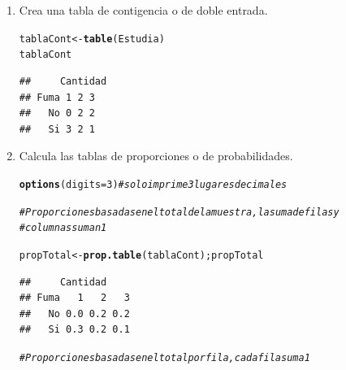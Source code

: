 \documentclass[12pt,letterpaper]{article}\usepackage[]{graphicx}\usepackage[]{color}
\makeatletter
\newcommand{\hlnum}[1]{\textcolor[rgb]{0.686,0.059,0.569}{#1}}%
\newcommand{\hlcom}[1]{\textcolor[rgb]{0.678,0.584,0.686}{\textit{#1}}}%
\newcommand{\hlstd}[1]{\textcolor[rgb]{0.345,0.345,0.345}{#1}}%
\newcommand{\hlkwb}[1]{\textcolor[rgb]{0.69,0.353,0.396}{#1}}%
\newcommand{\hlkwc}[1]{\textcolor[rgb]{0.333,0.667,0.333}{#1}}%
\newcommand{\hlkwd}[1]{\textcolor[rgb]{0.737,0.353,0.396}{\textbf{#1}}}%
\newenvironment{kframe}{%
 \def\at@end@of@kframe{}%
 \ifinner\ifhmode%
  \def\at@end@of@kframe{\end{minipage}}%
  \begin{minipage}{\columnwidth}%
 \fi\fi%
 \def\FrameCommand##1{\hskip\@totalleftmargin \hskip-\fboxsep
 \colorbox{shadecolor}{##1}\hskip-\fboxsep
     \hskip-\linewidth \hskip-\@totalleftmargin \hskip\columnwidth}%
 \MakeFramed {\advance\hsize-\width
   \@totalleftmargin\z@ \linewidth\hsize
   \@setminipage}}%
 {\par\unskip\endMakeFramed%
 \at@end@of@kframe}
\newenvironment{knitrout}{}{} %
\makeatother
\begin{document}
\begin{enumerate}
\item Crea una tabla de contigencia o de doble entrada. 

\begin{knitrout}
\color{fgcolor}\begin{kframe}
\begin{alltt}
\hlstd{tablaCont} \hlkwb{<-} \hlkwd{table}\hlstd{(Estudia)}
\hlstd{tablaCont}
\end{alltt}
\begin{verbatim}
##     Cantidad
## Fuma 1 2 3
##   No 0 2 2
##   Si 3 2 1
\end{verbatim}
\end{kframe}
\end{knitrout}

\item Calcula las tablas de proporciones o de probabilidades.

\begin{knitrout}
\color{fgcolor}\begin{kframe}
\begin{alltt}
\hlkwd{options}\hlstd{(}\hlkwc{digits}\hlstd{=}\hlnum{3}\hlstd{)} \hlcom{# solo imprime 3 lugares decimales}
\end{alltt}
\end{kframe}
\end{knitrout}

\begin{knitrout}
\color{fgcolor}\begin{kframe}
\begin{alltt}
\hlcom{# Proporciones basadas en el total de la muestra, la suma de filas y }
\hlcom{# columnas suman 1 }

\hlstd{propTotal} \hlkwb{<-} \hlkwd{prop.table}\hlstd{(tablaCont); propTotal}
\end{alltt}
\begin{verbatim}
##     Cantidad
## Fuma   1   2   3
##   No 0.0 0.2 0.2
##   Si 0.3 0.2 0.1
\end{verbatim}
\end{kframe}
\end{knitrout}

\begin{knitrout}
\color{fgcolor}\begin{kframe}
\begin{alltt}
\hlcom{# Proporciones basadas en el total por fila, cada fila suma 1 }


\end{alltt}
\end{kframe}
\end{knitrout}
\end{enumerate}
\end{document}

